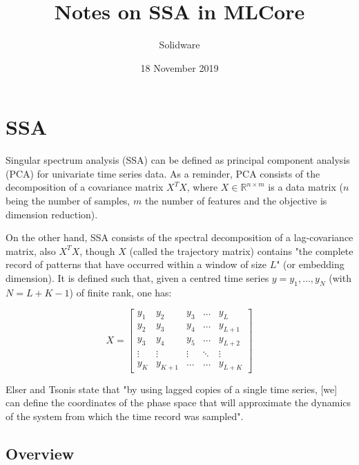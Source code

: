 \documentclass{article}
\begin{document}
\title{Notes on SSA in MLCore}
\author{Solidware}
\date{18 November 2019}
\maketitle


\section{SSA}
\label{ssa}

Singular spectrum analysis (SSA) can be defined as principal component analysis (PCA) for univariate time series data. As a reminder, PCA consists of the decomposition of a covariance matrix $X^TX$, where $X\in\mathbb{R}^{n\times m}$ is a data matrix ($n$ being the number of samples, $m$ the number of features and the objective is dimension reduction). 

On the other hand, SSA consists of the spectral decomposition of a lag-covariance matrix, also $X^TX$, though $X$ (called the trajectory matrix) contains "the complete record of patterns that have occurred within a window of size $L$" (or embedding dimension). It is defined such that, given a centred time series $y=y_1, \dots, y_N$ (with $N=L+K-1$) of finite rank, one has:

\[X=
  \begin{bmatrix} 
    y_{1} & y_{2} & y_{3} & \dots  & y_{L} \\
    y_{2} & y_{3} & y_{4} & \dots  & y_{L+1} \\
    y_{3} & y_{4} & y_{5} & \dots  & y_{L+2} \\
    \vdots & \vdots & \vdots & \ddots & \vdots \\
    y_{K} & y_{K+1} & \dots & \dots  & y_{L+K}
\end{bmatrix}
\]


Elser and Tsonis state that "by using lagged copies of a single time series, [we] can define the coordinates of the phase space that will approximate the dynamics of the system from which the time record was sampled".\\


\subsection{Overview}
\end{document}
